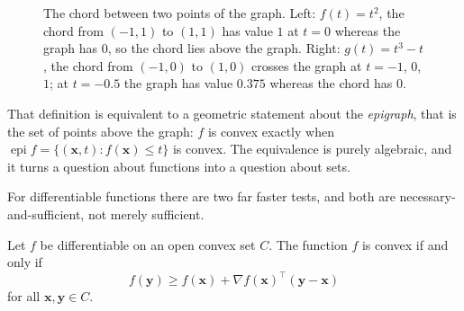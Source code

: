 \begin{figure}[!ht]
\centering
{}\quad
{}
\caption{The chord between two points of the graph. Left: $f(t)=t^{2}$, the chord from
$(-1,1)$ to $(1,1)$ has value $1$ at $t=0$ whereas the graph has $0$, so the chord lies above
the graph. Right: $g(t)=t^{3}-t$, the chord from $(-1,0)$ to $(1,0)$ crosses the graph at
$t=-1$, $0$, $1$; at $t=-0.5$ the graph has value $0.375$ whereas the chord has $0$.}
\label{fig:fungsi-konveks}
\end{figure}

That definition is equivalent to a geometric statement about the \emph{epigraph}, that is the
set of points above the graph: $f$ is convex exactly when
$\operatorname{epi}f=\{(\mathbf{x},t):f(\mathbf{x})\le t\}$ is convex. The equivalence is
purely algebraic, and it turns a question about functions into a question about sets.

For differentiable functions there are two far faster tests, and both are
necessary-and-sufficient, not merely sufficient.

\begin{teorema}
Let $f$ be differentiable on an open convex set $C$. The function $f$ is convex if and only
if
\[
  f(\mathbf{y})\ge f(\mathbf{x})+\nabla f(\mathbf{x})^{\top}(\mathbf{y}-\mathbf{x})
\]
for all $\mathbf{x},\mathbf{y}\in C$.
\end{teorema}


